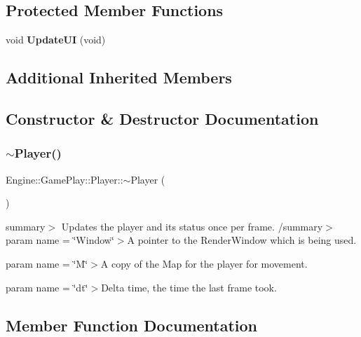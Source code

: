 \subsection*{Protected Member Functions}
\begin{DoxyCompactItemize}
\item 
\mbox{\label{class_engine_1_1_game_play_1_1_player_a1ed8e67b1e585015f13614277470a188}} 
void {\bfseries Update\+UI} (void)
\end{DoxyCompactItemize}
\subsection*{Additional Inherited Members}


\subsection{Constructor \& Destructor Documentation}
\mbox{\label{class_engine_1_1_game_play_1_1_player_a39c82fa94afe71949a7fff50fed2a4d0}} 
\subsubsection{\texorpdfstring{$\sim$\+Player()}{~Player()}}
{\footnotesize\ttfamily Engine\+::\+Game\+Play\+::\+Player\+::$\sim$\+Player (\begin{DoxyParamCaption}{ }\end{DoxyParamCaption})}

summary$>$ Updates the player and its status once per frame. /summary$>$ param name = \char`\"{}\+Window\char`\"{}$>$A pointer to the Render\+Window which is being used.

param name = \char`\"{}\+M\char`\"{}$>$A copy of the Map for the player for movement.

param name = \char`\"{}dt\char`\"{}$>$Delta time, the time the last frame took.

\subsection{Member Function Documentation}
\mbox{\label{class_engine_1_1_game_play_1_1_player_a4b3e08479cfc81c66eadf1e9da4a47fe}} 
